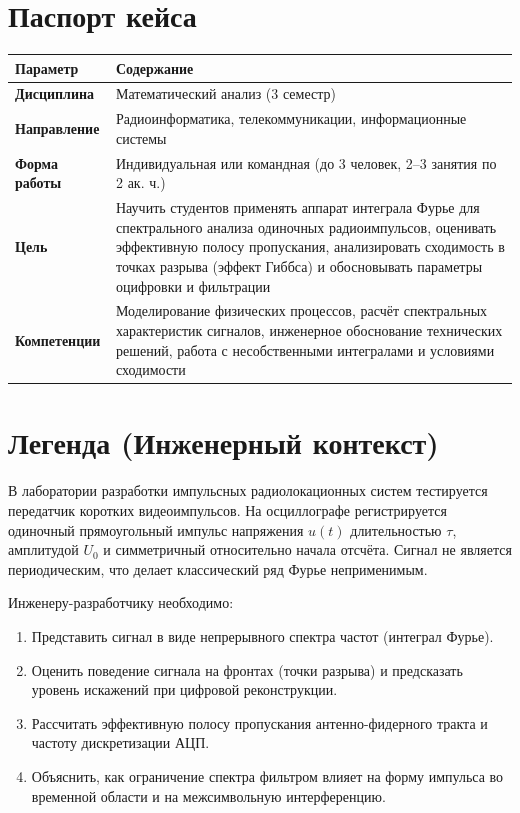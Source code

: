 \documentclass[12pt,a4paper]{article}
\begin{document}
\section{Паспорт кейса}
\begin{table}[h!]
\centering
\renewcommand{\arraystretch}{1.4}
\begin{tabularx}{\textwidth}{|>{\bfseries}l|X|}
\hline
\textbf{Параметр} & \textbf{Содержание} \\ \hline
Дисциплина & Математический анализ (3 семестр) \\ \hline
Направление & Радиоинформатика, телекоммуникации, информационные системы \\ \hline
Форма работы & Индивидуальная или командная (до 3 человек, 2--3 занятия по 2 ак. ч.) \\ \hline
Цель & Научить студентов применять аппарат интеграла Фурье для спектрального анализа одиночных радиоимпульсов, оценивать эффективную полосу пропускания, анализировать сходимость в точках разрыва (эффект Гиббса) и обосновывать параметры оцифровки и фильтрации \\ \hline
Компетенции & Моделирование физических процессов, расчёт спектральных характеристик сигналов, инженерное обоснование технических решений, работа с несобственными интегралами и условиями сходимости \\ \hline
\end{tabularx}
\end{table}

\section{Легенда (Инженерный контекст)}
В лаборатории разработки импульсных радиолокационных систем тестируется передатчик коротких видеоимпульсов. На осциллографе регистрируется одиночный прямоугольный импульс напряжения $u(t)$ длительностью $\tau$, амплитудой $U_0$ и симметричный относительно начала отсчёта. Сигнал не является периодическим, что делает классический ряд Фурье неприменимым.

Инженеру-разработчику необходимо:
\begin{enumerate}
    \item Представить сигнал в виде непрерывного спектра частот (интеграл Фурье).
    \item Оценить поведение сигнала на фронтах (точки разрыва) и предсказать уровень искажений при цифровой реконструкции.
    \item Рассчитать эффективную полосу пропускания антенно-фидерного тракта и частоту дискретизации АЦП.
    \item Объяснить, как ограничение спектра фильтром влияет на форму импульса во временной области и на межсимвольную интерференцию.
\end{enumerate}
\end{document}
